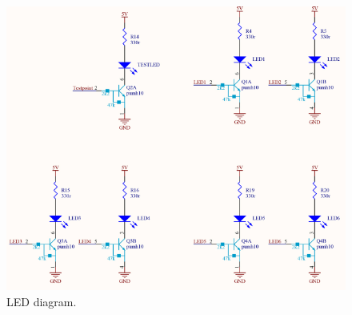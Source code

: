 \begin{figure}[H]
	\centering
	\includegraphics[scale=0.92]{figures/Led.pdf}
	\caption{LED diagram.}
	\label{labLed}
\end{figure}\vspace{-5mm}


